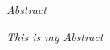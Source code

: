 \begin{center}
	\Huge\textit{Abstract}\\
	\vspace{1cm}
	
	\normalsize\textit{This is my Abstract}
\end{center}
\cleardoubleemptypage


